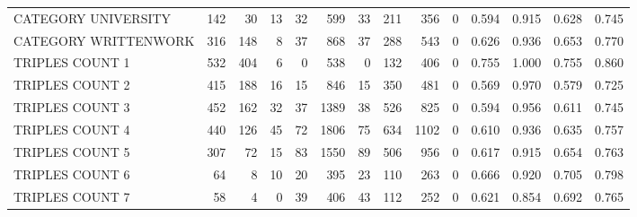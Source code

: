 \begin{tabular}{lrrrrrrrrrllll}
 CATEGORY UNIVERSITY      &             142 &            30 &              13 &              32 &             599 &   33 &  211 &  356 &    0 & 0.594 & 0.915 & 0.628 & 0.745 \\
 CATEGORY WRITTENWORK     &             316 &           148 &               8 &              37 &             868 &   37 &  288 &  543 &    0 & 0.626 & 0.936 & 0.653 & 0.770 \\
 TRIPLES COUNT 1          &             532 &           404 &               6 &               0 &             538 &    0 &  132 &  406 &    0 & 0.755 & 1.000 & 0.755 & 0.860 \\
 TRIPLES COUNT 2          &             415 &           188 &              16 &              15 &             846 &   15 &  350 &  481 &    0 & 0.569 & 0.970 & 0.579 & 0.725 \\
 TRIPLES COUNT 3          &             452 &           162 &              32 &              37 &            1389 &   38 &  526 &  825 &    0 & 0.594 & 0.956 & 0.611 & 0.745 \\
 TRIPLES COUNT 4          &             440 &           126 &              45 &              72 &            1806 &   75 &  634 & 1102 &    0 & 0.610 & 0.936 & 0.635 & 0.757 \\
 TRIPLES COUNT 5          &             307 &            72 &              15 &              83 &            1550 &   89 &  506 &  956 &    0 & 0.617 & 0.915 & 0.654 & 0.763 \\
 TRIPLES COUNT 6          &              64 &             8 &              10 &              20 &             395 &   23 &  110 &  263 &    0 & 0.666 & 0.920 & 0.705 & 0.798 \\
 TRIPLES COUNT 7          &              58 &             4 &               0 &              39 &             406 &   43 &  112 &  252 &    0 & 0.621 & 0.854 & 0.692 & 0.765 \\
\hline
\end{tabular}